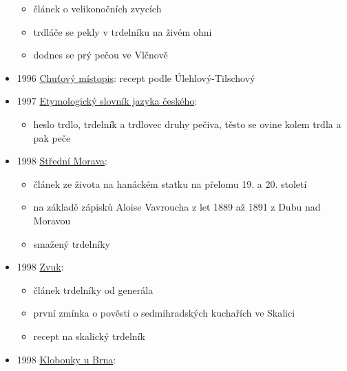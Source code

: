 \begin{itemize}
  \begin{itemize}
  \tightlist
  \item
    článek o velikonočních zvycích
  \item
    trdláče se pekly v trdelníku na živém ohni
  \item
    dodnes se prý pečou ve Vlčnově
  \end{itemize}
\item
  1996
  \href{https://ceskadigitalniknihovna.cz/view/uuid:955967f0-58cb-11e8-983f-005056827e51?page=uuid\%3A7daef930-7ef0-11e8-9588-5ef3fc9bb22f&fulltext=trdeln\%C3\%ADk\%20OR\%20trdeln\%C3\%ADky\%20OR\%20trdeln\%C3\%ADk\%C5\%AF&source=nkp}{Chuťový
  místopis}: recept podle Úlehlový-Tilschový
\item
  1997
  \href{https://ceskadigitalniknihovna.cz/view/uuid:df5be160-ef7c-11e2-9923-005056827e52?page=uuid:bba8b2b0-0f12-11e3-9439-005056825209&fulltext=trdlovec&source=nkp}{Etymologický
  slovník jazyka českého}:

  \begin{itemize}
  \tightlist
  \item
    heslo trdlo, trdelník a trdlovec druhy pečiva, těsto se ovine kolem
    trdla a pak peče
  \end{itemize}
\item
  1998
  \href{https://ceskadigitalniknihovna.cz/view/uuid:955967f0-58cb-11e8-983f-005056827e51?page=uuid\%3A7daef930-7ef0-11e8-9588-5ef3fc9bb22f&fulltext=trdeln\%C3\%ADk\%20OR\%20trdeln\%C3\%ADky\%20OR\%20trdeln\%C3\%ADk\%C5\%AF&source=nkp}{Střední
  Morava}:

  \begin{itemize}
  \tightlist
  \item
    článek ze života na hanáckém statku na přelomu 19. a 20. století
  \item
    na základě zápisků Aloise Vavroucha z let 1889 až 1891 z Dubu nad
    Moravou
  \item
    smažený trdelníky
  \end{itemize}
\item
  1998
  \href{https://www.digitalniknihovna.cz/mzk/uuid/uuid:dd805301-5c91-11eb-94b4-5ef3fc9ae867}{Zvuk}:

  \begin{itemize}
  \tightlist
  \item
    článek trdelníky od generála
  \item
    první zmínka o pověsti o sedmihradských kuchařích ve Skalici
  \item
    recept na skalický trdelník
  \end{itemize}
\item
  1998
  \href{https://ceskadigitalniknihovna.cz/view/uuid:90c1d400-282b-11ed-9c80-005056827e51?page=uuid\%3Af40f9ec2-58d4-4e4a-b664-846a40f83308&source=nkp}{Klobouky
  u Brna}:


\end{itemize}
